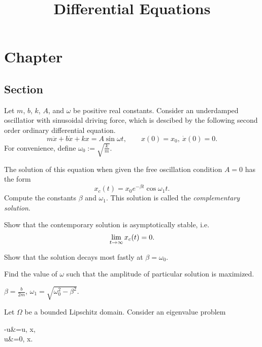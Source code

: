 \documentclass{../prb}
\title{Differential Equations}
\begin{document}
\maketitle
\tableofcontents


\chapter{Chapter}
\section{Section}



\begin{prb}
Let $m$, $b$, $k$, $A$, and $\omega$ be positive real constants.
Consider an underdamped oscillatior with sinusoidal driving force, which is descibed by the following second order ordinary differential equation.
\[m\ddot x+b\dot x+kx=A\sin\omega t,\qquad x(0)=x_0,\ \dot x(0)=0.\]
For convenience, define $\omega_0:=\sqrt{\frac km}$.
\begin{cond}
\item The solution of this equation when given the free oscillation condition $A=0$ has the form
\[x_c(t)=x_0e^{-\beta t}\cos\omega_1t.\]
Compute the constants $\beta$ and $\omega_1$.
This solution is called the \emph{complementary solution}.
\item Show that the contemporary solution is asymptotically stable, i.e.
\[\lim_{t\to\oo}x_c(t)=0.\]
\item Show that the solution decays most fastly at $\beta=\omega_0$.
\item Find the value of $\omega$ such that the amplitude of particular solution is maximized.

\end{cond}
\end{prb}

\begin{sol}
\item $\beta=\frac b{2m}$, $\omega_1=\sqrt{\omega_0^2-\beta^2}$.
\item 
\end{sol}



\begin{prb}
Let $\Omega$ be a bounded Lipschitz domain.
Consider an eigenvalue problem
\begin{pde*}
-\Delta u&=\lambda u, \: x\in\Omega,\\
u&=0, \: x\in\bd\Omega.
\end{pde*}


\end{prb}
\end{document}
